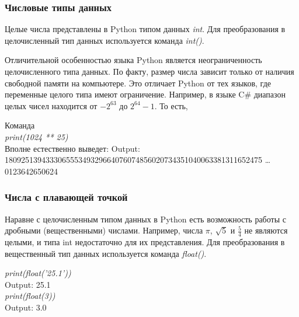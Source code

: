 \subsubsection*{Числовые типы данных}

Целые числа представлены в Python типом данных \textit{int}. Для преобразования в целочисленный тип данных используется команда \colorbox[rgb]{0.95, 0.95, 0.95}{\textit{int()}}. 

Отличительной особенностью языка Python является неограниченность целочисленного типа данных. По факту, размер числа зависит только от наличия свободной памяти на компьютере. Это отличает Python от тех языков, где переменные целого типа имеют ограничение. Например, в языке C\# диапазон целых чисел находится от $-2^{63}$ до $2^{64} - 1$. То есть,

\begin{flushleft}
	Команда \\
	\colorbox[rgb]{0.95, 0.95, 0.95}{\textit{print(1024 ** 25)}} \\
	Вполне естественно выведет:
	\colorbox[rgb]{0.95, 0.95, 0.95}{Output: 180925139433306555349329664076074856020734351040063381311652475 \ldots 0123642650624}
\end{flushleft}

\subsubsection*{Числа с плавающей точкой}

Наравне с целочисленным типом данных в Python есть возможность работы с дробными (вещественными) числами. Например, числа $\pi$, $\sqrt{5}$ и $\frac{5}{4}$ не являются целыми, и типа int недостаточно для их представления. Для преобразования в вещественный тип данных используется команда \colorbox[rgb]{0.95, 0.95, 0.95}{\textit{float()}}.

\begin{flushleft}
	\colorbox[rgb]{0.95, 0.95, 0.95}{\textit{print(float('25.1'))}} \\
	\colorbox[rgb]{0.95, 0.95, 0.95}{Output: 25.1} \\
	\vspace{1cm}
	\colorbox[rgb]{0.95, 0.95, 0.95}{\textit{print(float(3))}} \\
	\colorbox[rgb]{0.95, 0.95, 0.95}{Output: 3.0}
\end{flushleft}

